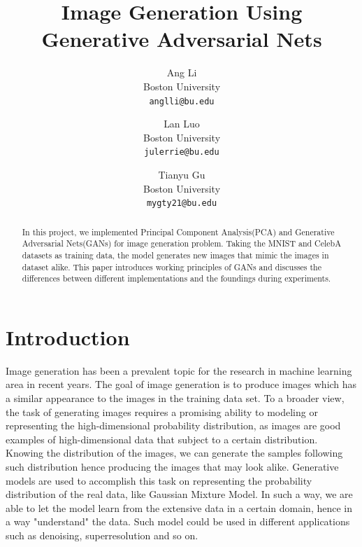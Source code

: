 \documentclass[10pt,twocolumn,letterpaper]{article}
\begin{document}
\title{Image Generation Using Generative Adversarial Nets}

\author{Ang Li\\
Boston University\\
{\tt\small anglli@bu.edu}
\and
Lan Luo\\
Boston University\\
{\tt\small julerrie@bu.edu}
\and
Tianyu Gu\\
Boston University\\
{\tt\small mygty21@bu.edu}
}

\maketitle

\begin{abstract}
In this project, we implemented Principal Component Analysis(PCA) and Generative Adversarial Nets(GANs) for image generation problem. Taking the MNIST and CelebA datasets as training data, the model generates new images that mimic the images in dataset alike. This paper introduces working principles of GANs and discusses the differences between different implementations and the foundings during experiments.
\end{abstract}

\section{Introduction}

Image generation has been a prevalent topic for the research in machine learning area in recent years. The goal of image generation is to produce images which has a similar appearance to the images in the training data set. To a broader view, the task of generating images requires a promising ability to modeling or representing the high-dimensional probability distribution, as images are good examples of high-dimensional data that subject to a certain distribution. Knowing the distribution of the images, we can generate the samples following such distribution hence producing the images that may look alike. Generative models are used to accomplish this task on representing the probability distribution of the real data, like Gaussian Mixture Model. In such a way, we are able to let the model learn from the extensive data in a certain domain, hence in a way "understand" the data. Such model could be used in different applications such as denoising, superresolution and so on.\\
\end{document}
